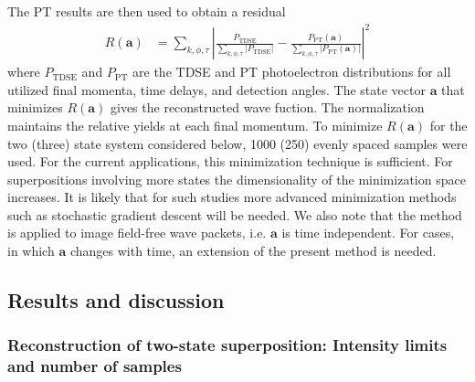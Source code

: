 The PT results are then used to obtain a residual 
%
\begin{align}
   R(\mathbf{a}) &=
   \sum_{k,\phi,\tau} \left|\frac{P_\text{TDSE}}{\sum\limits_{k,\phi,\tau}|P_\text{TDSE}|}-\frac{P_\text{PT}(\mathbf{a})}{\sum\limits_{k,\phi,\tau}|P_\text{PT}(\mathbf{a})|}\right|^2
   \label{eqn:residual}
\end{align}
%
where $P_\text{TDSE}$ and $P_\text{PT}$ are the TDSE and PT photoelectron distributions for all utilized final momenta, time delays, and detection angles. The state vector $\mathbf{a}$ that minimizes $R(\mathbf{a})$ gives the reconstructed wave fuction. The normalization maintains the relative yields at each final momentum. To minimize $R(\mathbf{a})$ for the two (three) state system considered below, 1000 (250) evenly spaced samples were used. 
For the current applications, this minimization technique is sufficient. For superpositions involving more states the dimensionality of the minimization space increases. It is likely that for such studies more advanced minimization methods such as stochastic gradient descent will be needed. We also note that the method is applied to image field-free wave packets, i.e. $\mathbf{a}$ is time independent. For cases, in which $\mathbf{a}$ changes with time, an extension of the present method is needed.

\subsection{\label{sub:results}Results and discussion}

\subsubsection{Reconstruction of two-state superposition: Intensity limits and number of samples}

